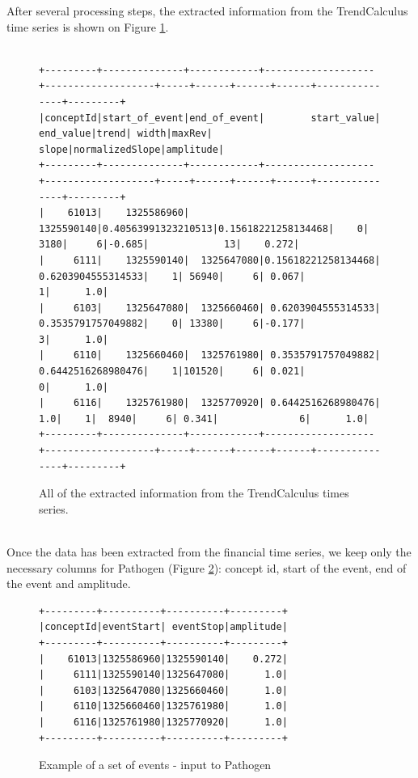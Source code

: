 \documentclass[a4, 11pt]{article}
\begin{document}
After several processing steps, the extracted information from the TrendCalculus time series is shown on Figure \ref{fig:data}.
\begin{figure}[!ht]
    \begin{BVerbatim}[baselinestretch=0.1,fontsize=\fontsize{6.8}{0}\selectfont]
   
+---------+--------------+------------+-------------------+-------------------+-----+------+------+------+---------------+---------+
|conceptId|start_of_event|end_of_event|        start_value|          end_value|trend| width|maxRev| slope|normalizedSlope|amplitude|
+---------+--------------+------------+-------------------+-------------------+-----+------+------+------+---------------+---------+
|    61013|    1325586960|  1325590140|0.40563991323210513|0.15618221258134468|    0|  3180|     6|-0.685|             13|    0.272|
|     6111|    1325590140|  1325647080|0.15618221258134468| 0.6203904555314533|    1| 56940|     6| 0.067|              1|      1.0|
|     6103|    1325647080|  1325660460| 0.6203904555314533| 0.3535791757049882|    0| 13380|     6|-0.177|              3|      1.0|
|     6110|    1325660460|  1325761980| 0.3535791757049882| 0.6442516268980476|    1|101520|     6| 0.021|              0|      1.0|
|     6116|    1325761980|  1325770920| 0.6442516268980476|                1.0|    1|  8940|     6| 0.341|              6|      1.0|
+---------+--------------+------------+-------------------+-------------------+-----+------+------+------+---------------+---------+
\end{BVerbatim}
    \caption{All of the extracted information from the TrendCalculus times series.}
    \label{fig:data}
\end{figure}
\\Once the data has been extracted from the financial time series, we keep only the necessary columns for Pathogen (Figure \ref{fig:data_pathogen}): concept id, start of the event, end of the event and amplitude.
\begin{figure}[!ht]
\centering
    \begin{BVerbatim}[baselinestretch=0.1,fontsize=\fontsize{12}{0}\selectfont]
+---------+----------+----------+---------+
|conceptId|eventStart| eventStop|amplitude|
+---------+----------+----------+---------+
|    61013|1325586960|1325590140|    0.272|
|     6111|1325590140|1325647080|      1.0|
|     6103|1325647080|1325660460|      1.0|
|     6110|1325660460|1325761980|      1.0|
|     6116|1325761980|1325770920|      1.0|
+---------+----------+----------+---------+
    \end{BVerbatim}
    \caption{Example of a set of events - input to Pathogen}
    \label{fig:data_pathogen}
\end{figure}
\end{document}
